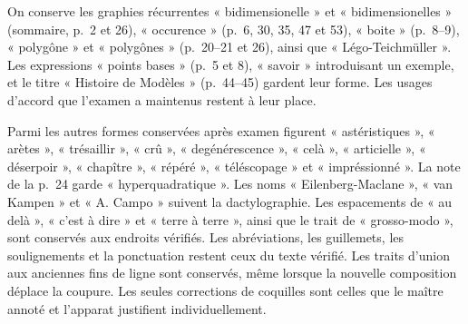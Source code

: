 \par\smallskip
On conserve les graphies récurrentes « bidimensionelle » et
« bidimensionelles » (sommaire, p.~2 et 26), « occurence » (p.~6, 30, 35,
47 et 53), « boite » (p.~8--9), « polygône » et « polygônes » (p.~20--21
et 26), ainsi que « Légo-Teichmüller ». Les expressions « points bases »
(p.~5 et 8), « savoir » introduisant un exemple, et le titre « Histoire
de Modèles » (p.~44--45) gardent leur forme. Les usages d'accord que
l'examen a maintenus restent à leur place.
\par
Parmi les autres formes conservées après examen figurent « astéristiques »,
« arètes », « trésaillir », « crû », « degénérescence », « celà »,
« articielle », « déserpoir », « chapître », « répéré », « téléscopage »
et « impréssionné ». La note de la p.~24 garde « hyperquadratique ».
Les noms « Eilenberg-Maclane », « van Kampen » et « A. Campo » suivent
la dactylographie. Les espacements de « au delà », « c'est à dire »
et « terre à terre », ainsi que le trait de « grosso-modo », sont
conservés aux endroits vérifiés. Les abréviations, les guillemets,
les soulignements et la ponctuation restent ceux du texte vérifié.
Les traits d'union aux anciennes fins de ligne sont conservés, même
lorsque la nouvelle composition déplace la coupure. Les seules
corrections de coquilles sont celles que le maître annoté et l'apparat
justifient individuellement.
